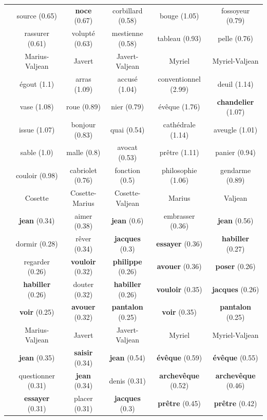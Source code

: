 \documentclass[
twocolumn,
]{ceurart}
\begin{document}
\begin{table}[!h]
\begin{tabular}{|c|c|c|c|c|c|}
		& source (0.65) & \textbf{noce} (0.67) & corbillard (0.58) & bouge (1.05) & fossoyeur (0.79) \\
		& rassurer (0.61) & volupté (0.63) & mestienne (0.58) & tableau (0.93) & pelle (0.76) \\ 
		\cline{2-6}
		& Marius-Valjean & Javert & Javert-Valjean & Myriel & Myriel-Valjean \\
		\cline{2-6}
		& égout (1.1) & arras (1.09) & accusé (1.04) & conventionnel (2.99) & deuil (1.14) \\ 
		& vase (1.08) & roue (0.89) & nier (0.79) & évêque (1.76) & \textbf{chandelier} (1.07) \\ 
		& issue (1.07) & bonjour (0.83) & quai (0.54) & cathédrale (1.14) & aveugle (1.01) \\ 
		& sable (1.0) & malle (0.8) & avocat (0.53) & prêtre (1.11) & panier (0.94) \\
		& couloir (0.98) & cabriolet (0.76) & fonction (0.5) & philosophie (1.06) & gendarme (0.89) \\ 
		\hline
		\hline
		\hline
		\parbox[t]{2mm}{} & Cosette & Cosette-Marius & Cosette-Valjean & Marius & Valjean \\ 
		& \textbf{jean} (0.34) & aimer (0.38) & \textbf{jean} (0.6) & embrasser (0.36) & \textbf{jean} (0.56) \\
		& dormir (0.28) & rêver (0.34) & \textbf{jacques} (0.3) & \textbf{essayer} (0.36) & \textbf{habiller} (0.27) \\ 
		& regarder (0.26) & \textbf{vouloir} (0.32) & \textbf{philippe} (0.26) & \textbf{avouer} (0.36) & \textbf{poser} (0.26) \\
		& \textbf{habiller} (0.26) & douter (0.32) & \textbf{habiller} (0.26) & \textbf{vouloir} (0.35) & \textbf{jacques} (0.26) \\
		& \textbf{voir} (0.25) & \textbf{avouer} (0.32) & \textbf{pantalon} (0.25) & \textbf{voir} (0.35) & \textbf{pantalon} (0.25) \\
		& Marius-Valjean & Javert & Javert-Valjean & Myriel & Myriel-Valjean \\
		& \textbf{jean} (0.35) & \textbf{saisir} (0.34) & \textbf{jean} (0.54) & \textbf{évêque} (0.59) & \textbf{évêque} (0.55) \\
		& questionner (0.31) & \textbf{jean} (0.34) & denis (0.31) & \textbf{archevêque} (0.52) & \textbf{archevêque} (0.46) \\
		& \textbf{essayer} (0.31) & placer (0.31) & \textbf{jacques} (0.3) & \textbf{prêtre} (0.45) & \textbf{prêtre} (0.42) \\

\end{tabular}
\end{table}
\end{document}
